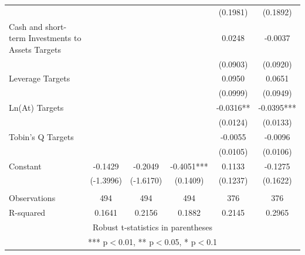 \documentclass[12pt]{article}
\begin{document}
\begin{table}[ht]
\begin{adjustbox}{height=10cm, max width=\textwidth}
\begin{tabular}{lccccc}
					&  &  &  & (0.1981) & (0.1892) \\
				Cash and short-term Investments to Assets Targets &  &  &  & 0.0248 & -0.0037 \\
					&  &  &  & (0.0903) & (0.0920) \\
				Leverage Targets &  &  &  & 0.0950 & 0.0651 \\
					&  &  &  & (0.0999) & (0.0949) \\
				Ln(At) Targets &  &  &  & -0.0316** & -0.0395*** \\
					&  &  &  & (0.0124) & (0.0133) \\
				Tobin's Q Targets &  &  &  & -0.0055 & -0.0096 \\
					&  &  &  & (0.0105) & (0.0106) \\
				Constant & -0.1429 & -0.2049 & -0.4051*** & 0.1133 & -0.1275 \\
					& (-1.3996) & (-1.6170) & (0.1409) & (0.1237) & (0.1622) \\
					&  &  &  &  &  \\
				Observations & 494 & 494 & 494 & 376 & 376 \\
					R-squared & 0.1641 & 0.2156 & 0.1882 & 0.2145 & 0.2965 \\ \hline
				\multicolumn{6}{c}{ Robust t-statistics in parentheses} \\
				\multicolumn{6}{c}{ *** p$<$0.01, ** p$<$0.05, * p$<$0.1} \\
			\end{tabular}
							
		\end{adjustbox}
	\end{table}

	 
\end{document}
